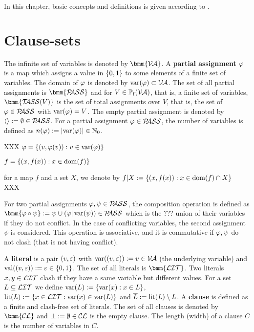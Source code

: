 \documentclass{report}
\begin{document}
In this chapter, basic concepts and definitions is given according to \cite{GwynneKullmann2013GoodRepresentationsIIex, BeyersdorffKullmann2014PHP,KullmannZhao2010Extremal}. 

\section{Clause-sets}
\label{sec:Clause-sets}

The infinite set of variables is denoted by $\bmm{\Va}$. A \textbf{partial assignment} $\varphi$ is a map which assigns a value in $\{ 0,1 \}$ to some elements of a finite set of variables. The domain of $\varphi$ is denoted by $\operatorname{var}(\varphi) \subset \mathcal{V\hspace{-0.1em}A}$. The set of all partial assignments is $\bmm{\Pass}$ and for $V \in \operatorname{\mathbb{P}_f}(\mathcal{V\hspace{-0.1em}A})$, that is, a finite set of variables, $\bmm{\Tass(V)}$ is the set of total assignments over $V$, that is, the set of $\varphi \in \mathcal{P\hspace{-0.32em}ASS}$ with $\operatorname{var}(\varphi) = V$. The empty partial assignment is denoted by $\langle  \rangle:= \emptyset \in \mathcal{P\hspace{-0.32em}ASS}$. For a partial assignment $\varphi \in \mathcal{P\hspace{-0.32em}ASS}$, the number of variables is defined as $n(\varphi):=\lvert \operatorname{var}(\varphi) \rvert \in \mathbb{N}_0$.

XXX $\varphi = \{ (v,\varphi(v)) : v \in \operatorname{var}(\varphi) \}$

$f = \{ (x,f(x)) : x \in \operatorname{dom}(f) \}$

for a map $f$ and a set $X$, we denote by $f | X := \{ (x,f(x)) : x \in \operatorname{dom}(f) \cap X \}$ XXX

For two partial assignments $\varphi, \psi \in \mathcal{P\hspace{-0.32em}ASS}$, the composition operation is defined as $\bmm{\vp \circ \psi} := \psi \cup (\vp | \var(\psi)) \in \Pass$ which is the ??? union of their variables if they do not conflict. In the case of conflicting variables, the second assignment $\psi$ is considered. This operation is associative, and it is commutative if $\varphi, \psi$ do not clash (that is not having conflict).

A \textbf{literal} is a pair $(v,\varepsilon)$ with $\operatorname{var}((v,\varepsilon)):=v \in \mathcal{V\hspace{-0.1em}A}$ (the underlying variable) and $\operatorname{val}((v,\varepsilon)):=\varepsilon \in \{ 0,1 \}$. The set of all literals is $\bmm{\Lit}$. Two literals $x, y \in \mathcal{LIT}$ clash if they have a same variable but different values. For a set $L \subseteq \mathcal{LIT}$ we define $\operatorname{var}(L) := \{ \operatorname{var}(x) :x \in L \}$, $\operatorname{lit}(L):= \{ x \in \mathcal{LIT} : \operatorname{var}(x) \in \operatorname{var}(L) \}$ and $\overline{L} := \operatorname{lit}(L) \setminus L$. A \textbf{clause} is defined as a finite and clash-free set of literals. The set of all clauses is denoted by $\bmm{\Cl}$ and $\bot := \emptyset \in \mathcal{CL}$ is the empty clause. The length (width) of a clause $C$ is the number of variables in $C$.
\end{document}

